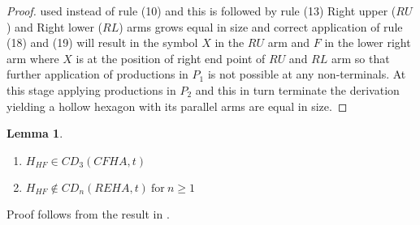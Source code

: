 \documentclass[11pt]{article}
\newtheorem{lemma}[theorem]{Lemma}
\begin{document}
\begin{proof}
used instead of rule (10) and this is followed by rule (13) Right
upper ($RU$) and Right lower ($RL$) arms grows equal in size and
correct application of rule (18) and (19) will result in the
symbol $X$ in the $RU$ arm and $F$ in the lower right arm  where
$X$ is at the position of right end point of $RU$ and $RL$ arm so
that further application of productions in $P_{1}$ is not possible
at any non-terminals. At this stage applying productions in
$P_{2}$ and this in turn terminate the derivation yielding a
hollow hexagon with its parallel arms are equal in size.
\end{proof}

\begin{lemma}
\begin{enumerate}
\item $H_{HF}\in CD_{3}(CFHA,t)$ \item $H_{HF}\notin
CD_{n}(REHA,t)~\mbox{for}~n\geq 1$
\end{enumerate}
\end{lemma}
Proof follows from the result in \cite{8}.
\\\\\\
\end{document}
